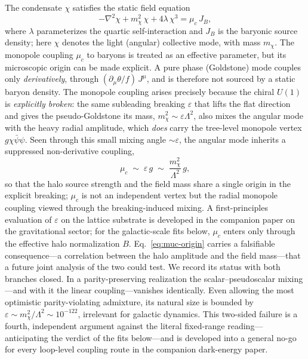 \documentclass[11pt,a4paper]{article}
\begin{document}
The condensate $\chi$ satisfies the static field equation
\begin{equation}
-\nabla^2 \chi + m_\chi^2\,\chi + 4\lambda\,\chi^3 = \mu_c\,J_B,
\label{eq:scalar-field}
\end{equation}
where $\lambda$ parameterizes the quartic self-interaction and
$J_B$ is the baryonic source density; here $\chi$ denotes the light
(angular) collective mode, with mass $m_\chi$.  The monopole
coupling $\mu_c$ to baryons is treated as an effective parameter,
but its microscopic origin can be made explicit.  A pure phase
(Goldstone) mode couples only \emph{derivatively}, through
$(\partial_\mu\theta/f)\,J^\mu$, and is therefore not sourced by a
static baryon density.  The monopole coupling arises precisely
because the chiral $U(1)$ is \emph{explicitly broken}: the same
subleading breaking $\varepsilon$ that lifts the flat direction and
gives the pseudo-Goldstone its mass, $m_\chi^2 \sim \varepsilon
\Lambda^2$, also mixes the angular mode with the heavy radial
amplitude, which \emph{does} carry the tree-level monopole vertex
$g\chi\bar\psi\psi$.  Seen through this small mixing angle
$\sim\varepsilon$, the angular mode inherits a suppressed
non-derivative coupling,
\begin{equation}
\mu_c \;\sim\; \varepsilon\,g \;\sim\; \frac{m_\chi^2}{\Lambda^2}\,g ,
\label{eq:muc-origin}
\end{equation}
so that the halo source strength and the field mass share a single
origin in the explicit breaking; $\mu_c$ is not an independent vertex
but the radial monopole coupling viewed through the
breaking-induced mixing.  A first-principles evaluation of
$\varepsilon$ on the lattice substrate is developed in the companion
paper on the gravitational sector; for the galactic-scale fits below,
$\mu_c$ enters only through the effective halo normalization $B$.
Eq.~\eqref{eq:muc-origin} carries a falsifiable consequence---a
correlation between the halo amplitude and the field mass---that a
future joint analysis of the two could test.
We record its status with both branches closed.  In a
parity-preserving realization the scalar--pseudoscalar mixing---and
with it the linear coupling---vanishes identically.  Even allowing
the most optimistic parity-violating admixture, its natural size is
bounded by $\varepsilon \sim m_\chi^2/\Lambda^2 \sim 10^{-122}$,
irrelevant for galactic dynamics.  This two-sided failure is a
fourth, independent argument against the literal fixed-range
reading---anticipating the verdict of the fits below---and is
developed into a general no-go for every loop-level coupling route
in the companion dark-energy paper.
\end{document}
